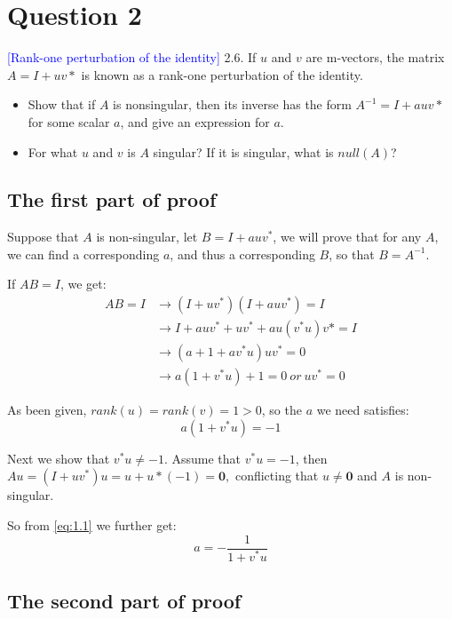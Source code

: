 \section*{Question 2}
\textcolor{blue}{[Rank-one perturbation of the identity]}
2.6. If $u$ and $v$ are m-vectors, 
the matrix $A = I + uv*$ is known as a rank-one perturbation of the identity. 
\begin{itemize}
    \item Show that if $A$ is nonsingular, then its inverse has the form $A^{-1} = I + auv*$ for some scalar $a$, and give an expression for $a$.
    \item For what $u$ and $v$ is $A$ singular? If it is singular, what is $null (A)$?
\end{itemize}



\subsection*{The first part of proof}
Suppose that $A$ is non-singular, 
let $B = I + auv^*$, we will prove that for any $A$,
we can find a corresponding $a$, and thus a corresponding $B$,
so that $B = A^{-1}$.

If $AB = I$, we get:
\begin{align*}
    AB = I &\rightarrow (I + uv^*)(I + auv^*) = I\\
           &\rightarrow I + auv^* + uv^* + au(v^*u)v* = I \\
           &\rightarrow (a + 1 + av^*u)uv^* = 0 \\
           &\rightarrow a(1 + v^*u) + 1 = 0 \ or\ uv^* = 0
\end{align*}

As been given,  $rank(u) = rank(v) = 1 > 0$,
so the $a$ we need satisfies:
\begin{equation}
    \label{eq:1.1}
    a(1 + v^*u) = -1
\end{equation}

Next we show that $v^*u \neq -1$. Assume that $v^*u = -1$, then 
$Au = (I + uv^*)u = u + u*(-1) =  \mathbf{0}, $ conflicting that
$u\neq \mathbf{0}$ and $A$ is non-singular.

So from \eqref{eq:1.1} we further get:
\begin{equation}
a = - \dfrac{1}{1+v^*u}
\end{equation}

\subsection*{The second part of proof}

